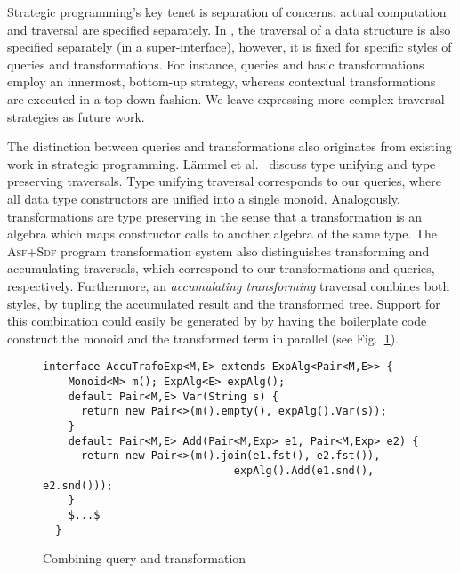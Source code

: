 Strategic programming's key tenet is separation of concerns:  actual computation and traversal are specified separately.
In \name, the traversal of a data structure is also specified separately (in a super-interface), however, it is fixed for specific styles of queries and transformations.
For instance, queries and basic transformations employ an innermost, bottom-up strategy, whereas contextual transformations are executed in a top-down fashion.
We leave expressing more complex traversal strategies as future work. 

The distinction between queries and transformations also originates from existing work in strategic programming. 
L\"ammel et al.~\cite{lammel2002typed} discuss type unifying and type preserving traversals.
Type unifying traversal corresponds to our queries, where all data type constructors are unified into a single monoid.
Analogously, \name transformations are type preserving in the sense that a transformation is an algebra which maps constructor calls to another algebra of the same type.
The \textsc{Asf+Sdf} program transformation system also distinguishes transforming and accumulating traversals, which correspond to our transformations and queries, respectively.
Furthermore, an \textit{accumulating transforming} traversal combines both styles, by tupling the accumulated result and the transformed tree.
Support for this combination could easily be generated by \name by having the boilerplate code construct the monoid and the transformed term in parallel (see Fig.~\ref{FIG:accuTrafo}).

\begin{figure}[t]
\begin{lstlisting}[mathescape=true]
  interface AccuTrafoExp<M,E> extends ExpAlg<Pair<M,E>> {
    Monoid<M> m(); ExpAlg<E> expAlg();
    default Pair<M,E> Var(String s) {
      return new Pair<>(m().empty(), expAlg().Var(s));
    }
    default Pair<M,E> Add(Pair<M,Exp> e1, Pair<M,Exp> e2) {
      return new Pair<>(m().join(e1.fst(), e2.fst()),
                              expAlg().Add(e1.snd(), e2.snd()));
    }
    $...$
  }
\end{lstlisting}
\caption{Combining query and transformation}
\label{FIG:accuTrafo}
\end{figure}

